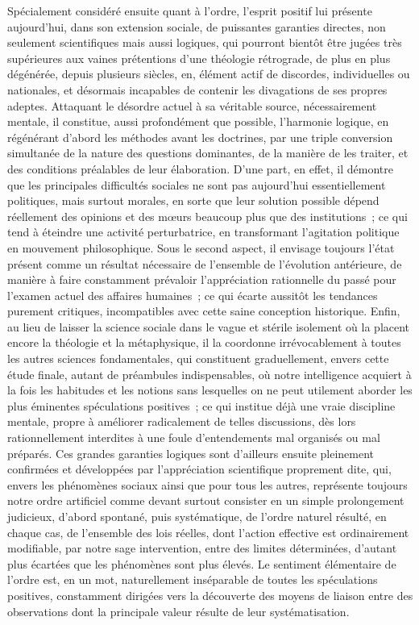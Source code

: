 \documentclass[french,twoside]{book} %
\begin{document}
Spécialement considéré ensuite quant à l’ordre, l’esprit positif lui présente aujourd’hui, dans son extension sociale, de puissantes garanties directes, non seulement scientifiques mais aussi logiques, qui pourront bientôt être jugées très supérieures aux vaines prétentions d’une théologie rétrograde, de plus en plus dégénérée, depuis plusieurs siècles, en, élément actif de discordes, individuelles ou nationales, et désormais incapables de contenir les divagations de ses propres adeptes. Attaquant le désordre actuel à sa véritable source, nécessairement mentale, il constitue, aussi profondément que possible, l’harmonie logique, en régénérant d’abord les méthodes avant les doctrines, par une triple conversion simultanée de la nature des questions dominantes, de la manière de les traiter, et des conditions préalables de leur élaboration. D’une part, en effet, il démontre que les principales difficultés sociales ne sont pas aujourd’hui essentiellement politiques, mais surtout morales, en sorte que leur solution possible dépend réellement des opinions et des mœurs beaucoup plus que des institutions ; ce qui tend à éteindre une activité perturbatrice, en transformant l’agitation politique en mouvement philosophique. Sous le second aspect, il envisage toujours l’état présent comme un résultat nécessaire de l’ensemble de l’évolution antérieure, de manière à faire constamment prévaloir l’appréciation rationnelle du passé pour l’examen actuel des affaires humaines ; ce qui écarte aussitôt les tendances purement critiques, incompatibles avec cette saine conception historique. Enfin, au lieu de laisser la science sociale dans le vague et stérile isolement où la placent encore la théologie et la métaphysique, il la coordonne irrévocablement à toutes les autres sciences fondamentales, qui constituent graduellement, envers cette étude finale, autant de préambules indispensables, où notre intelligence acquiert à la fois les habitudes et les notions sans lesquelles on ne peut utilement aborder les plus éminentes spéculations positives ; ce qui institue déjà une vraie discipline mentale, propre à améliorer radicalement de telles discussions, dès lors rationnellement interdites à une foule d’entendements mal organisés ou mal préparés. Ces grandes garanties logiques sont d’ailleurs ensuite pleinement confirmées et développées par l’appréciation scientifique proprement dite, qui, envers les phénomènes sociaux ainsi que pour tous les autres, représente toujours notre ordre artificiel comme devant surtout consister en un simple prolongement judicieux, d’abord spontané, puis systématique, de l’ordre naturel résulté, en chaque cas, de l’ensemble des lois réelles, dont l’action effective est ordinairement modifiable, par notre sage intervention, entre des limites déterminées, d’autant plus écartées que les phénomènes sont plus élevés. Le sentiment élémentaire de l’ordre est, en un mot, naturellement inséparable de toutes les spéculations positives, constamment dirigées vers la découverte des moyens de liaison entre des observations dont la principale valeur résulte de leur systématisation.\par
\end{document}

